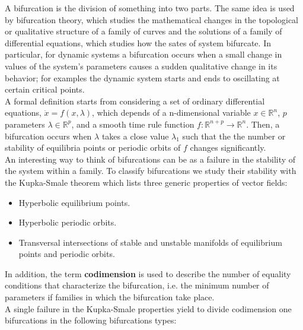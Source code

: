 A bifurcation is the division of something into two parts. The same idea is used by bifurcation theory, which studies the mathematical changes in the topological or qualitative structure of a family of curves and the solutions of a family of differential equations, which studies how the sates of system bifurcate. In particular, for dynamic systems a bifurcation occurs when a small change in values of the system's parameters causes a sudden qualitative change in its behavior; for examples the dynamic system starts and ends to oscillating at certain critical points. \cite{bifurcation} \\

A formal definition starts from considering a set of ordinary differential equations, $\dot{x} = f(x, \lambda)$, which depends of a n-dimensional variable $x\in\mathbb{R}^n$, $p$ parameters $\lambda\in\mathbb{R}^p$, and a smooth time rule function $f : \mathbb{R}^{n+p} \to \mathbb{R}^n$. Then, a bifurcation occurs when $\lambda$ takes a close value $\lambda_1$ such that the the number or stability of equilibria points or periodic orbits of $f$ changes significantly. \\

An interesting way to think of bifurcations can be as a failure in the stability of the system within a family. To classify bifurcations we study their stability with the Kupka-Smale theorem which lists three generic properties of vector fields:

\begin{itemize}
    \item Hyperbolic equilibrium points.
    \item Hyperbolic periodic orbits.
    \item Transversal intersections of stable and unstable manifolds of equilibrium points and periodic orbits.
\end{itemize}

In addition, the term \textbf{codimension} is used to describe the number of equality conditions that characterize the bifurcation, i.e. the minimum number of parameters if families in which the bifurcation take place. \\

A single failure in the Kupka-Smale properties yield to divide codimension one bifurcations in the following bifurcations types:

